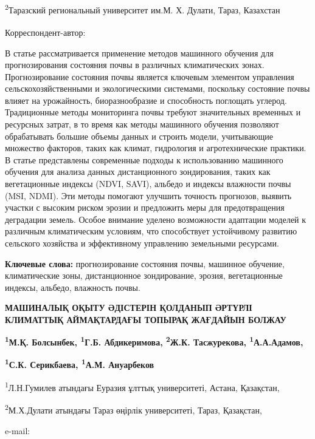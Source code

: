 \textsuperscript{2}Таразский региональный университет им.М. Х. Дулати,
Тараз, Казахстан

{\bfseries \textsuperscript{\envelope }}Корреспондент-автор:
\href{mailto:inf_8585@mail.ru}{}

В статье рассматривается применение методов машинного обучения для
прогнозирования состояния почвы в различных климатических зонах.
Прогнозирование состояния почвы является ключевым элементом управления
сельскохозяйственными и экологическими системами, поскольку состояние
почвы влияет на урожайность, биоразнообразие и способность поглощать
углерод. Традиционные методы мониторинга почвы требуют значительных
временных и ресурсных затрат, в то время как методы машинного обучения
позволяют обрабатывать большие объемы данных и строить модели,
учитывающие множество факторов, таких как климат, гидрология и
агротехнические практики. В статье представлены современные подходы к
использованию машинного обучения для анализа данных дистанционного
зондирования, таких как вегетационные индексы (NDVI, SAVI), альбедо и
индексы влажности почвы (MSI, NDMI). Эти методы помогают улучшить
точность прогнозов, выявить участки с высоким риском эрозии и предложить
меры для предотвращения деградации земель. Особое внимание уделено
возможности адаптации моделей к различным климатическим условиям, что
способствует устойчивому развитию сельского хозяйства и эффективному
управлению земельными ресурсами.

{\bfseries Ключевые слова:} прогнозирование состояния почвы, машинное
обучение, климатические зоны, дистанционное зондирование, эрозия,
вегетационные индексы, альбедо, влажность почвы.

{\bfseries МАШИНАЛЫҚ ОҚЫТУ ӘДІСТЕРІН ҚОЛДАНЫП ӘРТҮРЛІ КЛИМАТТЫҚ
АЙМАҚТАРДАҒЫ ТОПЫРАҚ ЖАҒДАЙЫН БОЛЖАУ}

{\bfseries \textsuperscript{1}М.Қ. Болсынбек, \textsuperscript{1}Г.Б.
Абдикеримова, \textsuperscript{2}Ж.К. Тасжурекова,
\textsuperscript{1}А.А.Адамов,}

{\bfseries \textsuperscript{1}С.К. Серикбаева\textsuperscript{\envelope },
\textsuperscript{1}А.М. Ануарбеков}

\textsuperscript{1}Л.Н.Гумилев атындағы Еуразия ұлттық университеті,
Астана, Қазақстан,

\textsuperscript{2}М.Х.Дулати атындағы Тараз өңірлік университеті,
Тараз, Қазақстан,

e-mail: \href{mailto:inf_8585@mail.ru}{}

